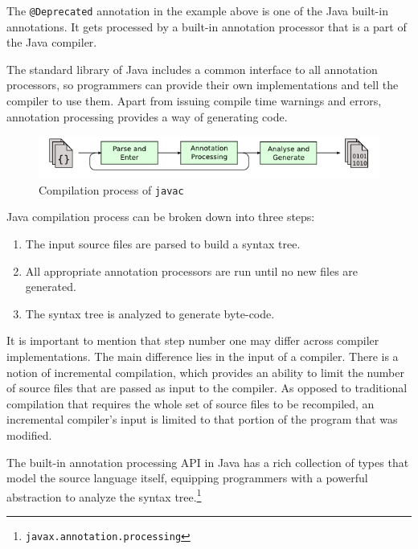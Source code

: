 \n

The \texttt{@Deprecated} annotation in the example above is one of the Java built-in annotations. It gets processed by a built-in annotation processor that is a part of the Java compiler.

\n

The standard library of Java includes a common interface to all annotation processors, so programmers can provide their own implementations and tell the compiler to use them. Apart from issuing compile time warnings and errors, annotation processing provides a way of generating code.

\begin{figure}[H]\centering
    \includegraphics[scale=0.8]{images/javac-flow.png}
    \caption[Compilation process of javac]{Compilation process of \texttt{javac}\footnotemark }\label{fig:javac-flow}
\end{figure}

Java compilation process can be broken down into three steps:

\begin{enumerate}
    \item The input source files are parsed to build a syntax tree.
    \item All appropriate annotation processors are run until no new files are generated.
    \item The syntax tree is analyzed to generate byte-code.
\end{enumerate}

It is important to mention that step number one may differ across compiler implementations. The main difference lies in the input of a compiler. There is a notion of incremental compilation, which provides an ability to limit the number of source files that are passed as input to the compiler. As opposed to traditional compilation that requires the whole set of source files to be recompiled, an incremental compiler’s input is limited to that portion of the program that was modified.

\n

The built-in annotation processing API in Java has a rich collection of types that model the source language itself, equipping programmers with a powerful abstraction to analyze the syntax tree.\footnote{\texttt{javax.annotation.processing}}
